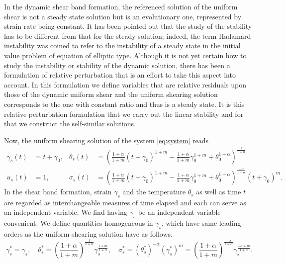 \documentclass[a4paper,11pt]{article}
\theoremstyle{remark}
\begin{document}
In the dynamic shear band formation, the referenced solution of the uniform shear is not a steady state solution but is an evolutionary one, represented by strain rate being constant. It has been pointed out that the study of the stability has to be different from that for the steady solution; indeed, the term Hadamard instability  was coined to refer to the instability of a steady state in the initial value problem of equation of elliptic type. Although it is not yet certain how to study the instability or stability of the dynamic solution, there has been a formulation of relative perturbation \cite{MC,FM,Tzavaras92} that is an effort to take this aspect into account. In this formulation we define variables that are relative residuals upon those of the dynamic uniform shear and the uniform shearing solution corresponds to the one with constant ratio and thus is a steady state. It is this relative perturbation formulation that we carry out the linear stability and for that we construct the self-similar solutions.

Now, the uniform shearing solution of the system \eqref{eq:system} reads
\begin{equation}
\begin{aligned}
 \gamma_s(t) &= t+\gamma_0, & \theta_s(t) &= \left(\frac{1+\alpha}{1+m} (t+\gamma_0)^{1+m} - \frac{1+\alpha}{1+m} \gamma_0^{1+m} + \theta_0^{1+\alpha}   \right)^{\frac{1}{1+\alpha}}\\
  u_s(t) &=1, & \sigma_s(t)&=\left(\frac{1+\alpha}{1+m} (t+\gamma_0)^{1+m} - \frac{1+\alpha}{1+m} \gamma_0^{1+m} + \theta_0^{1+\alpha}   \right)^{\frac{-\alpha}{1+\alpha}}(t+\gamma_0)^m.
\end{aligned}
\end{equation}
In the shear band formation, strain $\gamma_s$ and the temperature $\theta_s$ as well as time $t$ are regarded as interchangeable measures of time elapsed and each can serve as an independent variable. We find having $\gamma_s$ be an independent variable convenient. We define quantities homogeneous in $\gamma _s$, which have same leading orders as the uniform shearing solution have as follows.
$$ \gamma_s^* = \gamma_s, \quad \theta_s^*=\left( \frac{1+\alpha}{1+m}\right)^{\frac{1}{1+\alpha}} \gamma_s^{\frac{1+m}{1+\alpha}}, \quad \sigma^*_s = (\theta_s^*)^{-\alpha}(\gamma_s^*)^m = \left( \frac{1+\alpha}{1+m}\right)^{\frac{-\alpha}{1+\alpha}}\gamma_s^{\frac{-\alpha+m}{1+\alpha}}.$$
\end{document}
